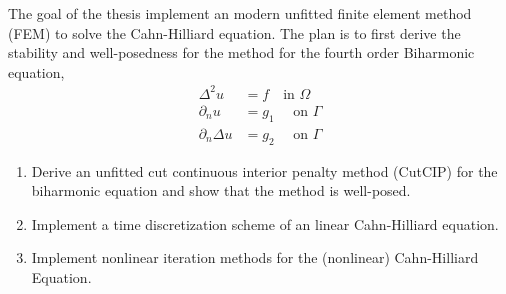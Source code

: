 The goal of the thesis implement an modern unfitted finite element method (FEM) to solve the Cahn-Hilliard equation. The plan is to first derive the stability and well-posedness for the method for the fourth order Biharmonic equation,
\[
    \begin{split}
\Delta ^2 u & = f \quad  \text{in } \Omega \\
\partial _{n} u & = g_{1} \quad \text{ on } \Gamma  \\
\partial _{n} \Delta u  & = g_{2} \quad \text{ on } \Gamma
    \end{split}
\]
\begin{enumerate}[label=(\alph*)]
    \item Derive an unfitted cut continuous interior penalty method (CutCIP) for the biharmonic equation and show that the method is well-posed.
    \item Implement a time discretization scheme of an linear Cahn-Hilliard equation.
    \item Implement nonlinear iteration methods for the (nonlinear) Cahn-Hilliard Equation.
\end{enumerate}

